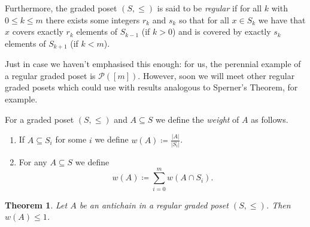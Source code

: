 \documentclass{report}
\theoremstyle{definition}
\theoremstyle{plain}
\newtheorem{thm}{Theorem}[section]
\theoremstyle{definition}
\begin{document}
 	Furthermore, the graded poset $(S,\leq)$ is said to be \emph{regular} if for all $k$ with $0\leq k\leq m$ there exists some integers $r_k$ and $s_k$ so that for all $x\in S_k$ we have that $x$ covers exactly $r_k$ elements of $S_{k-1}$ (if $k>0$) and is covered by exactly $s_k$ elements of $S_{k+1}$ (if $k<m$).
 	
 	Just in case we haven't emphasised this enough: for us, the perennial example of a regular graded poset is $\mathcal{P}([m])$. However, soon we will meet other regular graded posets which could use with results analogous to Sperner's Theorem, for example.
 	
 	For a graded poset $(S,\leq)$ and $A\subseteq S$ we define the \emph{weight} of $A$ as follows.
 	\begin{enumerate}[label=(\alph*)]
 		\item If $A\subseteq S_i$ for some $i$ we define $w(A) \coloneqq \frac{|A|}{|S_i|}$.
 		\item For any $A\subseteq S$ we define
 		\[
 			w(A)\coloneqq \sum_{i=0}^{m}w(A\cap S_i).
 		\]
 	\end{enumerate}
 	\begin{thm}\label{thm:wei_ant_leq_1}
 		Let $A$ be an antichain in a regular graded poset $(S,\leq)$. Then $w(A) \leq 1$.
 	\end{thm}
\end{document}
